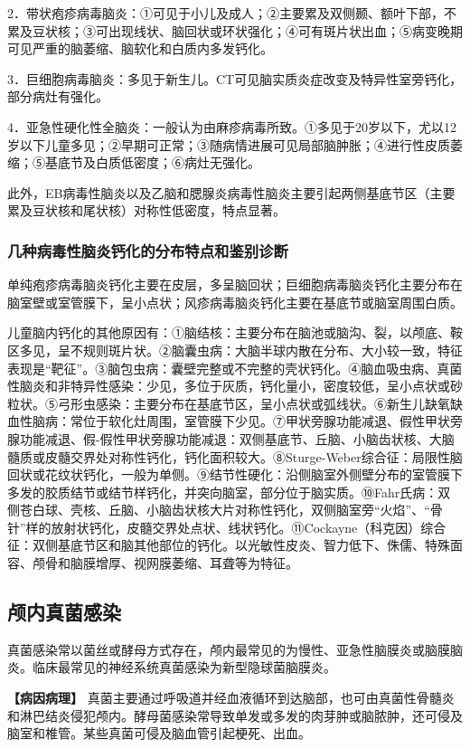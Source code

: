 2．带状疱疹病毒脑炎：①可见于小儿及成人；②主要累及双侧颞、额叶下部，不累及豆状核；③可出现线状、脑回状或环状强化；④可有斑片状出血；⑤病变晚期可见严重的脑萎缩、脑软化和白质内多发钙化。

3．巨细胞病毒脑炎：多见于新生儿。CT可见脑实质炎症改变及特异性室旁钙化，部分病灶有强化。

4．亚急性硬化性全脑炎：一般认为由麻疹病毒所致。①多见于20岁以下，尤以12岁以下儿童多见；②早期可正常；③随病情进展可见局部脑肿胀；④进行性皮质萎缩；⑤基底节及白质低密度；⑥病灶无强化。

此外，EB病毒性脑炎以及乙脑和腮腺炎病毒性脑炎主要引起两侧基底节区（主要累及豆状核和尾状核）对称性低密度，特点显著。

\subsubsection{几种病毒性脑炎钙化的分布特点和鉴别诊断}

单纯疱疹病毒脑炎钙化主要在皮层，多呈脑回状；巨细胞病毒脑炎钙化主要分布在脑室壁或室管膜下，呈小点状；风疹病毒脑炎钙化主要在基底节或脑室周围白质。

儿童脑内钙化的其他原因有：①脑结核：主要分布在脑池或脑沟、裂，以颅底、鞍区多见，呈不规则斑片状。②脑囊虫病：大脑半球内散在分布、大小较一致，特征表现是“靶征”。③脑包虫病：囊壁完整或不完整的壳状钙化。④脑血吸虫病、真菌性脑炎和非特异性感染：少见，多位于灰质，钙化量小，密度较低，呈小点状或砂粒状。⑤弓形虫感染：主要分布在基底节区，呈小点状或弧线状。⑥新生儿缺氧缺血性脑病：常位于软化灶周围，室管膜下少见。⑦甲状旁腺功能减退、假性甲状旁腺功能减退、假-假性甲状旁腺功能减退：双侧基底节、丘脑、小脑齿状核、大脑髓质或皮髓交界处对称性钙化，钙化面积较大。⑧Sturge-Weber综合征：局限性脑回状或花纹状钙化，一般为单侧。⑨结节性硬化：沿侧脑室外侧壁分布的室管膜下多发的胶质结节或结节样钙化，并突向脑室，部分位于脑实质。⑩Fahr氏病：双侧苍白球、壳核、丘脑、小脑齿状核大片对称性钙化，双侧脑室旁“火焰”、“骨针”样的放射状钙化，皮髓交界处点状、线状钙化。⑪Cockayne（科克因）综合征：双侧基底节区和脑其他部位的钙化。以光敏性皮炎、智力低下、侏儒、特殊面容、颅骨和脑膜增厚、视网膜萎缩、耳聋等为特征。

\subsection{颅内真菌感染}

真菌感染常以菌丝或酵母方式存在，颅内最常见的为慢性、亚急性脑膜炎或脑膜脑炎。临床最常见的神经系统真菌感染为新型隐球菌脑膜炎。

\textbf{【病因病理】}
真菌主要通过呼吸道并经血液循环到达脑部，也可由真菌性骨髓炎和淋巴结炎侵犯颅内。酵母菌感染常导致单发或多发的肉芽肿或脑脓肿，还可侵及脑室和椎管。某些真菌可侵及脑血管引起梗死、出血。

